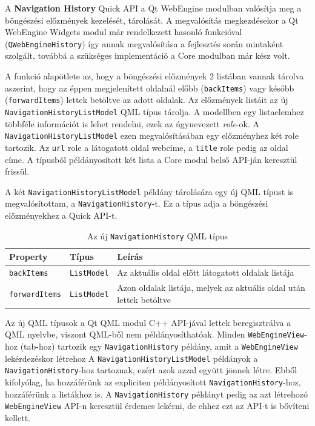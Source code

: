 \documentclass[12pt]{report}
\begin{document}
\noindent
A \textbf{Navigation History} Quick API a Qt WebEngine modulban valósítja meg a böngészési
előzmények kezelését, tárolását. A megvalósítás megkezdésekor a Qt WebEngine Widgets modul
már rendelkezett hasonló funkcióval (\texttt{QWebEngineHistory}) így annak megvalósítása
a fejlesztés során mintaként szolgált, továbbá a szükséges implementáció a Core modulban
már kész volt.

A funkció alapötlete az, hogy a böngészési előzmények 2 listában vannak tárolva aszerint,
hogy az éppen megjelenített oldalnál előbb (\texttt{backItems}) vagy később
(\texttt{forwardItems}) lettek betöltve az adott oldalak. Az előzmények listáit az új
\texttt{NavigationHistoryListModel} QML típus tárolja. A modellben egy listaelemhez többféle
információt is lehet rendelni, ezek az úgynevezett \textit{role}-ok. A
\texttt{NavigationHistoryListModel} ezen megvalósításában egy előzményhez két role tartozik.
Az \texttt{url} role a látogatott oldal webcíme, a \texttt{title} role pedig az oldal címe.
A típusból példányosított két lista a Core modul belső API-ján keresztül frissül.

A két \texttt{NavigationHistoryListModel} példány tárolására egy új QML típust is
megvalósítottam, a \texttt{NavigationHistory}-t. Ez a típus adja a böngészési előzményekhez
a Quick API-t.

\begin{table}[H]
    \centering
    \begin{tabular}{ | l | l | p{238pt} | }
        \hline
        \textbf{Property} & \textbf{Típus} & \textbf{Leírás} \\ \hline

        \texttt{backItems} & \texttt{ListModel} &
        Az aktuális oldal előtt látogatott oldalak listája
        \\ \hline

        \texttt{forwardItems} & \texttt{ListModel} &
        Azon oldalak listája, melyek az aktuális oldal után lettek betöltve
        \\ \hline
    \end{tabular}
    \caption{
        \label{tab:navigation-history-history-api}
        Az új \texttt{NavigationHistory} QML típus
    }
\end{table}

Az új QML típusok a Qt QML modul C++ API-jával lettek beregisztrálva a QML nyelvbe, viszont
QML-ből nem példányosíthatóak. Minden \texttt{WebEngineView}-hoz (tab-hoz) tartozik egy
\texttt{NavigationHistory} példány, amit a \texttt{WebEngineView} lekérdezéskor létrehoz
A \texttt{NavigationHistoryListModel} példányok a \texttt{NavigationHistory}-hoz tartoznak,
ezért azok azzal együtt jönnek létre. Ebből kifolyólag, ha hozzáférünk az expliciten
példányosított \texttt{NavigationHistory}-hoz, hozzáférünk a listákhoz is. A
\texttt{NavigationHistory} példányt pedig az azt létrehozó \texttt{WebEngineView} API-n
keresztül érdemes lekérni, de ehhez ezt az API-t is bővíteni kellett.
\end{document}

